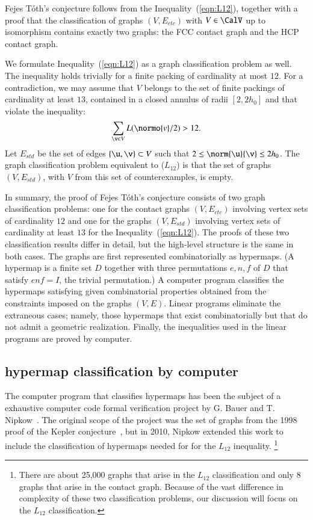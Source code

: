 \documentclass{llncs}
\begin{document}
Fejes T\'oth's conjecture follows from the
Inequality~(\ref{eqn:L12}), together with a proof that the
classification of graphs $(V,E_{ctc})$ with $V\in \CalV$ up to
isomorphism contains exactly two graphs: the FCC contact graph and the
HCP contact graph.

We formulate Inequality~(\ref{eqn:L12}) as a graph classification
problem as well.  The inequality holds trivially for a finite packing
of cardinality at most $12$.  For a contradiction, we may assume that
$V$ belongs to the set of finite packings of cardinality at least $13$,
contained in a closed annulus of radii $[2,2h_0]$ and that violate the
inequality:
\[
\sum_{\v\in V} L(\normo{v}/2) > 12.
\]
Let $E_{std}$ be the set of edges $\{\u,\v\}\subset V$ such that
$2\le\norm{\u}{\v}\le 2h_0$.  The graph classification problem
equivalent to ($L_{12}$) is that the set of graphs $(V,E_{std})$, with
$V$ from this set of counterexamples, is empty.

In summary, the proof of Fejes T\'oth's  conjecture consists of
two graph classification problems: one for the contact graphs
$(V,E_{ctc})$ involving vertex sets of cardinality $12$ and one for
the graphs $(V,E_{std})$ involving vertex sets of cardinality at least
$13$ for the Inequality~(\ref{eqn:L12}).  The proofs of these two
classification results differ in detail, but the high-level structure
is the same in both cases.  The graphs are first represented
combinatorially as hypermaps.  (A hypermap is a finite set $D$
together with three permutations $e,n,f$ of $D$ that satisfy $e n f =
I$, the trivial permutation.)  A computer program classifies the
hypermaps satisfying given combinatorial properties obtained from the
constraints imposed on the graphs $(V,E)$.  Linear programs eliminate
the extraneous cases; namely, those hypermaps that exist
combinatorially but that do not admit a geometric realization.
Finally, the inequalities used in the linear programs are proved by
computer.

\subsection{hypermap classification by computer}

The computer program that classifies hypermaps has been the subject of
a exhaustive computer code formal verification project by G. Bauer and
T. Nipkow~\cite{Nipkow:2005:Tame}.  The original scope of the project
was the set of graphs from the 1998 proof of the Kepler
conjecture~\cite{Hales:2006:DCG}, but in 2010, Nipkow extended this
work to include the classification of hypermaps needed for for the
$L_{12}$ inequality.  \footnote{There are about 25,000 graphs that
  arise in the $L_{12}$ classification and only $8$ graphs that arise
  in the contact graph.  Because of the vast difference in complexity
  of these two classification problems, our discussion will focus on
  the $L_{12}$ classification.}
\end{document}
